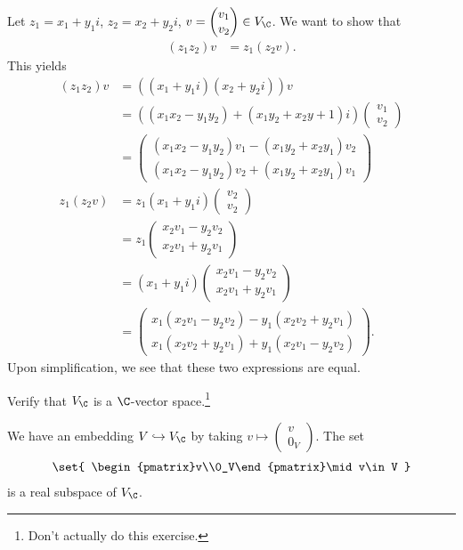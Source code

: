 \documentclass[10pt]{mypackage}
\begin{document}
\begin{example}
Let $z_1 = x_1 + y_1i$, $z_2 = x_2 + y_2i$, $v = \begin{pmatrix}v_1\\v_2\end{pmatrix}\in V_{\C}$. We want to show that
\begin{align*}
  \left(z_1z_2\right)v &= z_1\left(z_2v\right).
\end{align*}
This yields
\begin{align*}
  \left(z_1z_2\right)v &= \left(\left(x_1 + y_1i\right)\left(x_2 + y_2i\right)\right)v\\
                       &= \left(\left(x_1x_2 - y_1y_2\right) + \left(x_1y_2 + x_2y+1\right)i\right) \begin{pmatrix}v_1\\v_2\end{pmatrix}\\
                       &= \begin{pmatrix}\left(x_1x_2-y_1y_2\right)v_1 - \left(x_1y_2 + x_2y_1\right)v_2 \\ \left(x_1x_2-y_1y_2\right)v_2 + \left(x_1y_2 + x_2y_1\right)v_1\end{pmatrix}\\
  z_1\left(z_2v\right) &= z_1\left(x_1 + y_1i\right) \begin{pmatrix}v_2\\v_2\end{pmatrix}\\
                       &= z_1 \begin{pmatrix}x_2v_1 - y_2v_2\\x_2v_1 + y_2v_1\end{pmatrix}\\
                       &= \left(x_1 + y_1i\right) \begin{pmatrix}x_2v_1 - y_2v_2\\x_2v_1 + y_2v_1\end{pmatrix}\\
                       &= \begin{pmatrix}x_1\left(x_2v_1 - y_2v_2\right) - y_1\left(x_2v_2 + y_2v_1\right) \\ x_1\left(x_2v_2 + y_2v_1\right) + y_1\left(x_2v_1 - y_2v_2\right)\end{pmatrix}.
\end{align*}
Upon simplification, we see that these two expressions are equal.
\begin{exercise}
  Verify that $V_{\C}$ is a $\C$-vector space.\footnote{Don't actually do this exercise.}
\end{exercise}
We have an embedding $V\hookrightarrow V_{\C}$ by taking $v\mapsto \begin{pmatrix}v\\0_V\end{pmatrix}$. The set
\begin{align*}
  \set{ \begin{pmatrix}v\\0_V\end{pmatrix}\mid v\in V }
\end{align*}
is a real subspace of $V_{\C}$.
\end{example}
\end{document}

